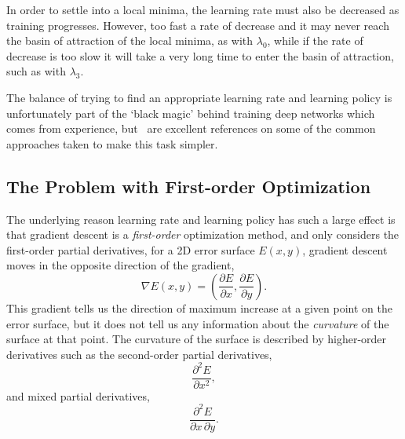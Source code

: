 \documentclass[thesis]{subfiles}
\begin{document}
In order to settle into a local minima, the learning rate must also be decreased as training progresses. However, too fast a rate of decrease and it may never reach the basin of attraction of the local minima, as with $\lambda_0$, while if the rate of decrease is too slow it will take a very long time to enter the basin of attraction, such as with $\lambda_3$. 

The balance of trying to find an appropriate learning rate and learning policy is unfortunately part of the `black magic' behind training deep networks which comes from experience, but~\citep{Bottou2012sgdtricks, goodfellow2016deep} are excellent references on some of the common approaches taken to make this task simpler.

\subsection{The Problem with First-order Optimization}
The underlying reason learning rate and learning policy has such a large effect is that gradient descent is a \emph{first-order} optimization method, and only considers the first-order partial derivatives, \ie for a 2D error surface $E(x, y)$, gradient descent moves in the opposite direction of the gradient,
\begin{equation}
    \nabla E(x, y) = {\left(\frac{\partial E}{\partial x}, \frac{\partial E}{\partial y}\right)}.
\end{equation}
This gradient tells us the direction of maximum increase at a given point on the error surface, but it does not tell us any information about the \emph{curvature} of the surface at that point. The curvature of the surface is described by higher-order derivatives such as the second-order partial derivatives, \eg
\begin{equation}
    \frac{\partial^2 E}{\partial x^2},
\end{equation}
and mixed partial derivatives, \eg
\begin{equation}
    \frac{\partial^2 E}{\partial x\,\partial y}.
\end{equation}
%
\end{document}
